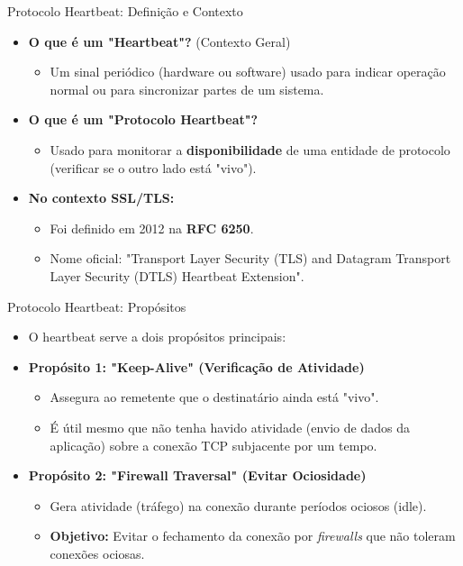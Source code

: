 \begin{frame}{Protocolo Heartbeat: Definição e Contexto}
    \begin{itemize}
        \item \textbf{O que é um "Heartbeat"?} (Contexto Geral)
              \begin{itemize}
                  \item Um sinal periódico (hardware ou software) usado para indicar operação normal ou para sincronizar partes de um sistema.
              \end{itemize}

        \item \textbf{O que é um "Protocolo Heartbeat"?}
              \begin{itemize}
                  \item Usado para monitorar a \textbf{disponibilidade} de uma entidade de protocolo (verificar se o outro lado está "vivo").
              \end{itemize}

        \item \textbf{No contexto SSL/TLS:}
              \begin{itemize}
                  \item Foi definido em 2012 na \textbf{RFC 6250}.
                  \item Nome oficial: "Transport Layer Security (TLS) and Datagram Transport Layer Security (DTLS) Heartbeat Extension".
              \end{itemize}
    \end{itemize}
\end{frame}

\begin{frame}{Protocolo Heartbeat: Propósitos}
    \begin{itemize}
        \item O heartbeat serve a dois propósitos principais:

        \item \textbf{Propósito 1: "Keep-Alive" (Verificação de Atividade)}
              \begin{itemize}
                  \item Assegura ao remetente que o destinatário ainda está "vivo".
                  \item É útil mesmo que não tenha havido atividade (envio de dados da aplicação) sobre a conexão TCP subjacente por um tempo.
              \end{itemize}

        \item \textbf{Propósito 2: "Firewall Traversal" (Evitar Ociosidade)}
              \begin{itemize}
                  \item Gera atividade (tráfego) na conexão durante períodos ociosos (idle).
                  \item \textbf{Objetivo:} Evitar o fechamento da conexão por \textit{firewalls} que não toleram conexões ociosas.
              \end{itemize}
    \end{itemize}
\end{frame}

